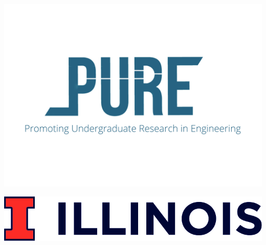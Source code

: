 \documentclass{a0poster}
\begin{document}
\begin{multicols}{3}
\begin{minipage}[c]{0.5\linewidth}
\begin{centering}
\includegraphics[width=\linewidth]{pure_logof.pdf}
\end{centering}
\end{minipage}
\begin{minipage}[c]{0.5\linewidth}
\begin{centering}
\includegraphics[width=\linewidth]{logo.jpg}
\end{centering}
\end{minipage}

\end{multicols}
\end{document}
